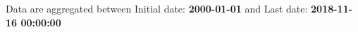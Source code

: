 Data are aggregated between Initial date: \textbf{2000-01-01} and Last date: \textbf{2018-11-16 00:00:00}
